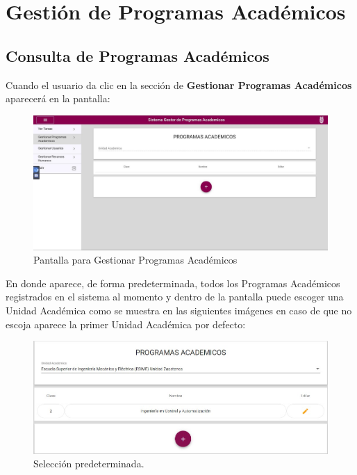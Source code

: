 \section{Gestión de Programas Académicos}
    \subsection{Consulta de Programas Académicos}
        Cuando el usuario da clic en la sección de \textbf{Gestionar Programas Académicos} aparecerá en la pantalla:

        \begin{figure}[H]
        	\centering
        	\hypertarget{consultarpa}{\includegraphics[width=0.7\linewidth]{images/SP3/ConsultarPA}}
        	\caption{Pantalla para Gestionar Programas Académicos}
        	\label{consultarpa}
        \end{figure}

          En donde aparece, de forma predeterminada, todos los Programas Académicos  registrados en el sistema al momento y dentro de la pantalla puede escoger una Unidad Académica  como se muestra  en las siguientes imágenes en caso de que no escoja aparece la primer Unidad Académica por defecto:

         \begin{figure}[H]
                \centering
                \hypertarget{prede}{\includegraphics[width=0.7\linewidth]{images/SP3/Predeterminado}}
                \caption{Selección predeterminada.}
                \label{prede}
            \end{figure}

